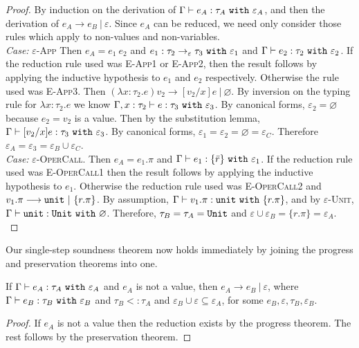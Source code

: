 \begin{proof} By induction on the derivation of $\Gamma \vdash e_A: \tau_A~\mathtt{with}~ \varepsilon_A$, and then the derivation of $e_A \longrightarrow e_B~|~\varepsilon$. Since $e_A$ can be reduced, we need only consider those rules which apply to non-values and non-variables. \\

\textit{Case:} \textsc{$\varepsilon$-App} Then $e_A = e_1 ~ e_2$ and $e_1: \tau_2 \rightarrow_{\varepsilon} \tau_3~\mathtt{with}~ \varepsilon_1$ and $\Gamma \vdash e_2: \tau_2~\mathtt{with}~ \varepsilon_2$. If the reduction rule used was \textsc{E-App1} or \textsc{E-App2}, then the result follows by applying the inductive hypothesis to $e_1$ and $e_2$ respectively. Otherwise the rule used was \textsc{E-App3}. Then $(\lambda x: \tau_2. e) v_2 \longrightarrow [ v_2/x] e~|~\varnothing$. By inversion on the typing rule for $\lambda x:  \tau_2. e$ we know $\Gamma, x:  \tau_2 \vdash  e:  \tau_3~\mathtt{with}~ \varepsilon_3$. By canonical forms, $\varepsilon_2 = \varnothing$ because $ e_2 =  v_2$ is a value. Then by the substitution lemma, $ \Gamma \vdash [ v_2/x] e :  \tau_3~\mathtt{with}~ \varepsilon_3$. By canonical forms, $\varepsilon_1 = \varepsilon_2 = \varnothing = \varepsilon_C$. Therefore $\varepsilon_A = \varepsilon_3 = \varepsilon_B \cup \varepsilon_C$.\\

\textit{Case:} \textsc{$\varepsilon$-OperCall}. Then $e_A = e_1.\pi$ and $ \Gamma \vdash e_1 : \{ \bar r \}~\mathtt{with}~ \varepsilon_1$. If the reduction rule used was \textsc{E-OperCall1} then the result follows by applying the inductive hypothesis to $ e_1$. Otherwise the reduction rule used was \textsc{E-OperCall2} and $v_1.\pi \longrightarrow \mathtt{unit}~|~\{ r.\pi \}$. By assumption, $\Gamma \vdash v_1.\pi : \mathtt{unit}~\mathtt{with}~ \{ r.\pi \}$, and by \textsc{$\varepsilon$-Unit}, $\Gamma \vdash \mathtt{unit}: \mathtt{Unit}~\mathtt{with}~ \varnothing$. Therefore, $\tau_B = \tau_A = \mathtt{Unit}$ and $\varepsilon \cup \varepsilon_B = \{ r.\pi \} = \varepsilon_A$.\\

\end{proof}

Our single-step soundness theorem now holds immediately by joining the progress and preservation theorems into one.

\begin{theorem}
If $ \Gamma \vdash  e_A:  \tau_A~\mathtt{with}~ \varepsilon_A$ and $ e_A$ is not a value, then $e_A \longrightarrow e_B~|~\varepsilon$, where $ \Gamma \vdash e_B:  \tau_B~\mathtt{with}~ \varepsilon_B$ and $ \tau_B <:  \tau_A$ and $\varepsilon_B \cup \varepsilon \subseteq \varepsilon_A$, for some $e_B, \varepsilon, \tau_B, \varepsilon_B$.
\end{theorem}
\begin{proof}
If $ e_A$ is not a value then the reduction exists by the progress theorem. The rest follows by the preservation theorem.
\end{proof}

